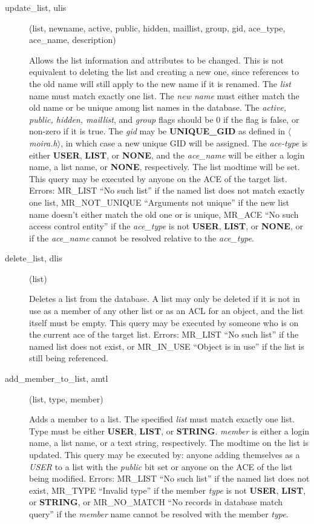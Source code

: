 \begin{description}
\item[update\_list, ulis](list, newname, active, public, hidden, maillist,
group, gid, ace\_type, ace\_name, description)

Allows the list information and attributes to be changed. This is not
equivalent to deleting the list and creating a new one, since
references to the old name will still apply to the new name if it is
renamed. The {\em list} name must match exactly one list. The {\em new
name} must either match the old name or be unique among list names in
the database. The {\em active, public, hidden, maillist}, and {\em
group} flags should be 0 if the flag is false, or non-zero if it is
true. The {\em gid} may be {\bf UNIQUE\_GID} as defined in {\em
$\langle$moira.h$\rangle$}, in which case a new unique GID will be
assigned. The {\em ace-type} is either {\bf USER}, {\bf LIST}, or {\bf
NONE}, and the {\em ace\_name} will be either a login name, a list
name, or {\bf NONE}, respectively. The list modtime will be set. This
query may be executed by anyone on the ACE of the target list. Errors:
MR\_LIST ``No such list'' if the named list does not match exactly one
list, MR\_NOT\_UNIQUE ``Arguments not unique'' if the new list name
doesn't either match the old one or is unique, MR\_ACE ``No such access
control entity'' if the {\em ace\_type} is not {\bf USER}, {\bf LIST},
or {\bf NONE}, or if the {\em ace\_name} cannot be resolved relative to
the {\em ace\_type}.

\item[delete\_list, dlis](list)

Deletes a list from the database.  A list may only be deleted if it is
not in use as a member of any other list or as an ACL for an object,
and the list itself must be empty.  This query may be executed by
someone who is on the current ace of the target list.  Errors:
MR\_LIST ``No such list'' if the named list does not exist, or
MR\_IN\_USE ``Object is in use'' if the list is still being referenced.

\item[add\_member\_to\_list, amtl](list, type, member)

Adds a member to a list.  The specified {\em list} must match exactly
one list.  Type must be either {\bf USER}, {\bf LIST}, or {\bf STRING}.
{\em member} is either a login name, a list name, or a text string,
respectively.  The modtime on the list is updated.  This query may
be executed by: anyone adding themselves as a {\em USER} to a list with the
{\em public} bit set or anyone on the ACE of the list being modified.
Errors: MR\_LIST ``No such list'' if the named list does not exist,
MR\_TYPE ``Invalid type'' if the member {\em type} is not {\bf USER}, {\bf LIST}, or
{\bf STRING}, or MR\_NO\_MATCH ``No records in database match query'' if the
{\em member} name cannot be resolved with the member {\em type}.


\end{description}
